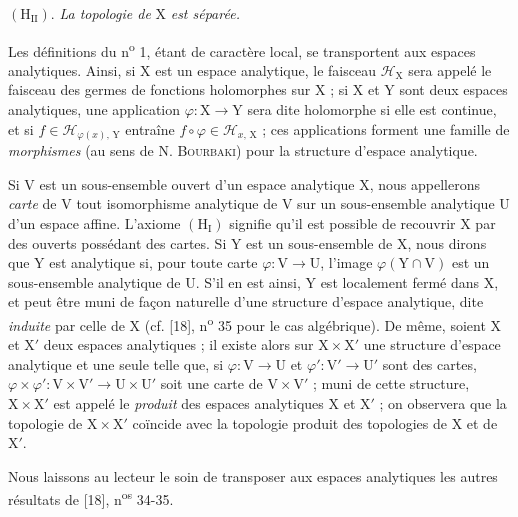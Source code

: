 $(\mathrm{H}_{\mathrm{II}})$. \emph{La topologie de} $\mathrm{X}$ \emph{est séparée.}

Les définitions du n\textsuperscript{o} 1, étant de caractère local, se transportent aux espaces analytiques. Ainsi, si $\mathrm{X}$ est un espace analytique, le faisceau $\mathcal{H}_{\mathrm{X}}$ sera appelé le faisceau des germes de fonctions holomorphes sur $\mathrm{X}$ ; si $\mathrm{X}$ et $\mathrm{Y}$ sont deux espaces analytiques, une application $\varphi : \mathrm{X} \to \mathrm{Y}$ sera dite holomorphe si elle est continue, et si $f \in \mathcal{H}_{\varphi(x),\,\mathrm{Y}}$ entraîne $f \circ \varphi \in \mathcal{H}_{x,\,\mathrm{X}}$ ; ces applications forment une famille de \emph{morphismes} (au sens de N. \textsc{Bourbaki}) pour la structure d'espace analytique.



Si $\mathrm{V}$ est un sous-ensemble ouvert d'un espace analytique $\mathrm{X}$, nous appellerons \textit{carte} de $\mathrm{V}$ tout isomorphisme analytique de $\mathrm{V}$ sur un sous-ensemble analytique $\mathrm{U}$ d'un espace affine. L'axiome $(\mathrm{H}_{\mathrm{I}})$ signifie qu'il est possible de recouvrir $\mathrm{X}$ par des ouverts possédant des cartes. Si $\mathrm{Y}$ est un sous-ensemble de $\mathrm{X}$, nous dirons que $\mathrm{Y}$ est analytique si, pour toute carte $\varphi : \mathrm{V} \to \mathrm{U}$, l'image $\varphi(\mathrm{Y} \cap \mathrm{V})$ est un sous-ensemble analytique de $\mathrm{U}$. S'il en est ainsi, $\mathrm{Y}$ est localement fermé dans $\mathrm{X}$, et peut être muni de façon naturelle d'une structure d'espace analytique, dite \textit{induite} par celle de $\mathrm{X}$ (cf. [18], n\textsuperscript{o} 35 pour le cas algébrique). De même, soient $\mathrm{X}$ et $\mathrm{X}'$ deux espaces analytiques ; il existe alors sur $\mathrm{X} \times \mathrm{X}'$ une structure d'espace analytique et une seule telle que, si $\varphi : \mathrm{V} \to \mathrm{U}$ et $\varphi' : \mathrm{V}' \to \mathrm{U}'$ sont des cartes, $\varphi \times \varphi' : \mathrm{V} \times \mathrm{V}' \to \mathrm{U} \times \mathrm{U}'$ soit une carte de $\mathrm{V} \times \mathrm{V}'$ ; muni de cette structure, $\mathrm{X} \times \mathrm{X}'$ est appelé le \textit{produit} des espaces analytiques $\mathrm{X}$ et $\mathrm{X}'$ ; on observera que la topologie de $\mathrm{X} \times \mathrm{X}'$ coïncide avec la topologie produit des topologies de $\mathrm{X}$ et de $\mathrm{X}'$.

Nous laissons au lecteur le soin de transposer aux espaces analytiques les autres résultats de [18], n\textsuperscript{os} 34-35.


